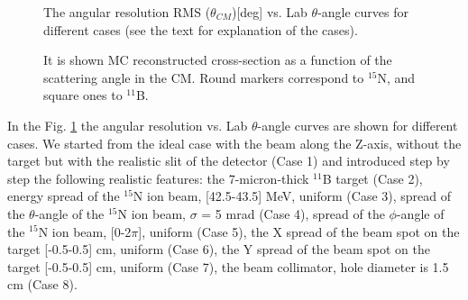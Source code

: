 \documentclass[%
 aip,
cp,  %
 amsmath,amssymb,%
 reprint,%
]{revtex4-2}
\begin{document}
\begin{figure}[h!]
\caption{The angular resolution RMS ($\theta_{CM}$)[deg] vs. Lab $\theta$-angle curves for different cases (see the text for explanation of the cases).}
\label{ris:fig3}
\end{figure}

\begin{figure}[h!]
\caption{It is shown MC reconstructed cross-section as a function of the scattering angle in the CM. Round markers correspond to ${}^{15}$N, and
square ones to ${}^{11}$B.}
\label{ris:fig4}
\end{figure}


In the Fig. \ref{ris:fig3} the angular resolution vs. Lab $\theta$-angle curves are shown for different cases. We started from the ideal case with the beam along the Z-axis, without the target but with the realistic slit of the detector (Case 1) and introduced step by step the following realistic features: the 7-micron-thick ${}^{11}$B target (Case 2), energy spread of the ${}^{15}$N ion beam, [42.5-43.5] MeV, uniform (Case 3), spread of the $\theta$-angle of the ${}^{15}$N ion beam, $\sigma$ = 5 mrad (Case 4),  spread of the $\phi$-angle of the ${}^{15}$N ion beam, [0-2$\pi$], uniform (Case 5), the X spread of the beam spot on the target [-0.5-0.5] cm, uniform (Case 6), the Y spread of the beam spot on the target [-0.5-0.5] cm, uniform (Case 7), the beam collimator, hole diameter is 1.5 cm  (Case 8).
\end{document}
